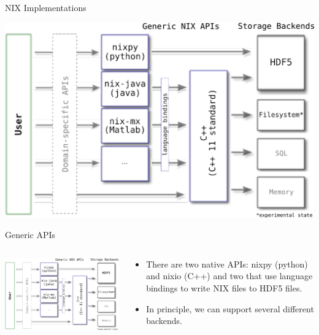 \documentclass[pdftex]{beamer}
\begin{document}
\begin{frame}{NIX Implementations}
    \begin{center}
        \includegraphics[width=0.85\columnwidth]{resources/nix_apis}
    \end{center}
\end{frame}


\begin{frame}{Generic APIs}
    \begin{columns}
        \begin{column}{6cm}
            \includegraphics[width=\columnwidth]{resources/nix_apis}
        \end{column}
        \begin{column}{6.5cm}
            \begin{itemize}
                \item There are two native APIs: nixpy (python) and nixio (C++) and two that use language bindings to write NIX files to HDF5 files.
                \vspace{1ex}
                \item In principle, we can support several different backends. 
            \end{itemize}
        \end{column}
    \end{columns}
\end{frame}
\end{document}
